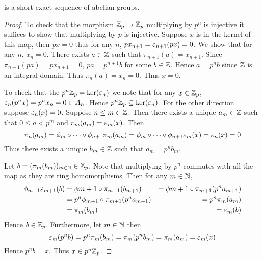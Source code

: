 \begin{prop}[Multiplying by $p^n$ is injective 
    and $x_n = 0$ implies $x \in p^n \Z_p$]
    \begin{center}\end{center}
    is a short exact sequence of abelian groups.
\end{prop}
\begin{proof}
    To check that the morphism $\mathbb{Z}_p \to \mathbb{Z}_p$ 
    multiplying by $p^n$ is injective
    it suffices to show that multiplying by $p$ is 
    injective.
    Suppose $x$ is in the kernel of this map, 
    then $px = 0$ thus for any $n$, 
    $p x_{n+1} = \varepsilon_{n+1}(px) = 0$.
    We show that for any $n$, $x_n = 0$.
    There exists $a \in \mathbb{Z}$ such that
    $\pi_{n+1} (a)= x_{n+1}$.
    Since $\pi_{n+1}(pa) = p x_{n+1} = 0$,
    $pa = p^{n+1} b$ for some $b \in \mathbb{Z}$.
    Hence $a = p^n b$ since $\mathbb{Z}$ is an integral domain.
    Thus $\pi_n (a) = x_n = 0$.
    Thus $x = 0$.

    To check that the $p^n \mathbb{Z}_p = \ker(\varepsilon_n)$
    we note that for any $x \in \mathbb{Z}_p$, 
    $\varepsilon_n (p^n x) = p^n x_n = 0 \in A_n$.
    Hence $p^n \mathbb{Z}_p \subseteq \ker(\varepsilon_n)$.
    For the other direction suppose $\varepsilon_n(x)= 0$.
    Suppose $n \le m \in \mathbb{Z}$.
    Then there exists a unique $a_m \in \mathbb{Z}$ such that $0 \le a < p^m$
    and $\pi_m (a_m) = \varepsilon_m(x)$.
    Then 
    \[\pi_n (a_m) = \phi_m \circ \cdots \circ \phi_{n+1} \pi_m (a_m) = 
    \phi_m \circ \cdots \circ \phi_{n+1} \varepsilon_m (x) = \varepsilon_n (x) = 0\]
    Thus there exists a unique $b_m \in \mathbb{Z}$ such that $a_m = p^n b_m$.
    
    Let $b = (\pi_m(b_m))_{m \in \mathbb{N}} \in \mathbb{Z}_p$.
    Note that multiplying by $p^n$ commutes with all the map
    as they are ring homomorphisms.
    Then for any $m \in \mathbb{N}$,
    \begin{align*}
        \phi_{m+1} \varepsilon_{m+1}(b) &= \phi{m+1} \circ \pi_{m+1} (b_{m+1})
        &= \phi{m+1} \circ \pi_{m+1} (p^n a_{m+1})\\
        &= p^n \phi_{m+1} \circ \pi_{m+1} (p^n a_{m+1})
        &= p^n \pi_m (a_m) \\
        &= \pi_m(b_m) &= \varepsilon_m(b)
    \end{align*}
    Hence $b \in \mathbb{Z}_p$.
    Furthermore, 
    let $m \in \mathbb{N}$ then
    \[ \varepsilon_m(p^n b) = p^n \pi_m (b_m) = \pi_m (p^n b_m) = 
    \pi_m (a_m) = \varepsilon_m(x)\]
    Hence $p^n b = x$.
    Thus $x \in p^n \Z_p$.
\end{proof}

